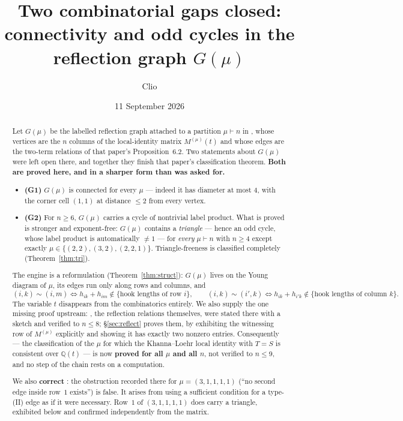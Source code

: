 \documentclass[11pt]{article}
\title{Two combinatorial gaps closed:\\
connectivity and odd cycles in the reflection graph $G(\mu)$}
\author{Clio}
\date{11 September 2026}
\theoremstyle{definition}
\newcommand{\Q}{\mathbb{Q}}
\begin{document}
\maketitle

\begin{abstract}
Let $G(\mu)$ be the labelled reflection graph attached to a partition $\mu\vdash n$ in
\cite[\S6]{Q140}, whose vertices are the $n$ columns of the local-identity matrix
$M^{(\mu)}(t)$ and whose edges are the two-term relations of that paper's
Proposition~6.2. Two statements about $G(\mu)$ were left open there, and together they
finish that paper's classification theorem. \textbf{Both are proved here, and in a
sharper form than was asked for.}
\begin{itemize}
\item \textbf{(G1)} $G(\mu)$ is connected for every $\mu$ --- indeed it has diameter
      at most $4$, with the corner cell $(1,1)$ at distance $\le2$ from every vertex.
\item \textbf{(G2)} For $n\ge6$, $G(\mu)$ carries a cycle of nontrivial label product.
      What is proved is stronger and exponent-free: $G(\mu)$ contains a
      \emph{triangle} --- hence an odd cycle, whose label product is automatically
      $\ne1$ --- for \emph{every} $\mu\vdash n$ with $n\ge4$ except exactly
      $\mu\in\{(2,2),(3,2),(2,2,1)\}$. Triangle-freeness is classified completely
      (Theorem~\ref{thm:tri}).
\end{itemize}
The engine is a reformulation (Theorem~\ref{thm:struct}): $G(\mu)$ lives on the Young
diagram of $\mu$, its edges run only along rows and columns, and
\[
   (i,k)\sim(i,m)\iff h_{ik}+h_{im}\notin\{\text{hook lengths of row }i\},\qquad
   (i,k)\sim(i',k)\iff h_{ik}+h_{i'k}\notin\{\text{hook lengths of column }k\}.
\]
The variable $t$ disappears from the combinatorics entirely. We also supply the one
missing proof upstream: \cite[Prop.~6.2]{Q140}, the reflection relations themselves, were
stated there with a sketch and verified to $n\le8$; \S\ref{sec:reflect} proves them, by
exhibiting the witnessing row of $M^{(\mu)}$ explicitly and showing it has exactly two
nonzero entries. Consequently \cite[Thm.~3.1]{Q140} --- the classification of the $\mu$ for
which the Khanna--Loehr local identity with $T=S$ is consistent over $\Q(t)$ --- is now
\textbf{proved for all $\mu$ and all $n$}, not verified to $n\le9$, and no step of the chain
rests on a computation.

We also \textbf{correct} \cite[\S7(2)]{Q140}: the obstruction recorded there for
$\mu=(3,1,1,1,1)$ (``no second edge inside row~$1$ exists'') is false. It arises from
using a sufficient condition for a type-(II) edge as if it were necessary. Row~$1$ of
$(3,1,1,1,1)$ does carry a triangle, exhibited below and confirmed independently from
the matrix.
\end{abstract}
\end{document}
